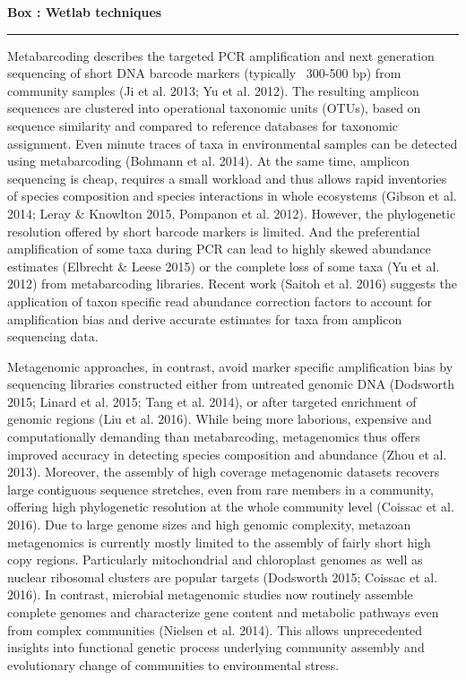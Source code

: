 \documentclass[12pt]{article}
\newcounter{Box}
\begin{document}
\noindent
\colorbox{gray!20}{
  \begin{minipage}{0.97\textwidth}
    \label{box:wet}
    \noindent
    {\bf \large Box \theBox: Wetlab techniques} 
    \vspace{1pt}
    \hrule
    \vspace{1pt}
    
    Metabarcoding describes the targeted PCR amplification and next
    generation sequencing of short DNA barcode markers (typically
    ~300-500 bp) from community samples (Ji et al. 2013; Yu et
    al. 2012). The resulting amplicon sequences are clustered into
    operational taxonomic units (OTUs), based on sequence similarity
    and compared to reference databases for taxonomic assignment. Even
    minute traces of taxa in environmental samples can be detected
    using metabarcoding (Bohmann et al. 2014). At the same time,
    amplicon sequencing is cheap, requires a small workload and thus
    allows rapid inventories of species composition and species
    interactions in whole ecosystems (Gibson et al. 2014; Leray \&
    Knowlton 2015, Pompanon et al. 2012). However, the phylogenetic
    resolution offered by short barcode markers is limited. And the
    preferential amplification of some taxa during PCR can lead to
    highly skewed abundance estimates (Elbrecht \& Leese 2015) or the
    complete loss of some taxa (Yu et al. 2012) from metabarcoding
    libraries. Recent work (Saitoh et al. 2016) suggests the
    application of taxon specific read abundance correction factors to
    account for amplification bias and derive accurate estimates for
    taxa from amplicon sequencing data.  

    Metagenomic approaches, in contrast, avoid marker specific
    amplification bias by sequencing libraries constructed either from
    untreated genomic DNA (Dodsworth 2015; Linard et al. 2015; Tang et
    al. 2014), or after targeted enrichment of genomic regions (Liu et
    al. 2016). While being more laborious, expensive and
    computationally demanding than metabarcoding, metagenomics thus
    offers improved accuracy in detecting species composition and
    abundance (Zhou et al. 2013). Moreover, the assembly of high
    coverage metagenomic datasets recovers large contiguous sequence
    stretches, even from rare members in a community, offering high
    phylogenetic resolution at the whole community level (Coissac et
    al. 2016). Due to large genome sizes and high genomic complexity,
    metazoan metagenomics is currently mostly limited to the assembly
    of fairly short high copy regions. Particularly mitochondrial and
    chloroplast genomes as well as nuclear ribosomal clusters are
    popular targets (Dodsworth 2015; Coissac et al. 2016). In
    contrast, microbial metagenomic studies now routinely assemble
    complete genomes and characterize gene content and metabolic
    pathways even from complex communities (Nielsen et al. 2014). This
    allows unprecedented insights into functional genetic process
    underlying community assembly and evolutionary change of
    communities to environmental stress.
  \end{minipage}
}
\end{document}
